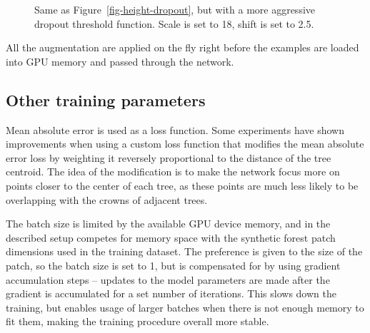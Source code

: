 \begin{figure}
\caption[Effect of a stronger height-dependent modified sigmoid dropout on a single aspen tree.]{\label{fig-height-dropout-aggressive}Same as
Figure~\ref{fig-height-dropout}, but with a more aggressive dropout
threshold function. Scale is set to 18, shift is set to 2.5.}
\end{figure}

All the augmentation are applied on the fly right before the examples are loaded into GPU memory and passed through the network.

\subsection{Other training parameters}\label{sec-other-training-params}

Mean absolute error is used as a loss function.
Some experiments have shown improvements when using a custom loss function that modifies the mean absolute error loss by weighting it reversely proportional to the distance of the tree centroid.
The idea of the modification is to make the network focus more on points closer to the center of each tree, as these points are much less likely to be overlapping with the crowns of adjacent trees.

The batch size is limited by the available GPU device memory, and in the described setup competes for memory space with the synthetic forest patch dimensions used in the training dataset.
The preference is given to the size of the patch, so the batch size is set to 1, but is compensated for by using gradient accumulation steps – updates to the model parameters are made after the gradient is accumulated for a set number of iterations.
This slows down the training, but enables usage of larger batches when there is not enough memory to fit them, making the training procedure overall more stable.

